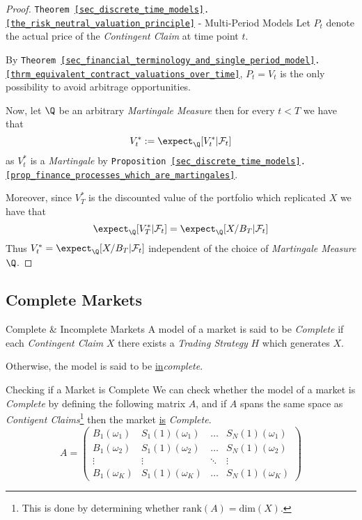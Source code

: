 \documentclass[11pt,a4paper]{article}
\begin{document}
  \begin{proof}{\texttt{Theorem \ref{sec_discrete_time_models}.\ref{the_risk_neutral_valuation_principle}} - Multi-Period Models}\label{prf_risk_neutral_valuation_principle}
    Let $P_t$ denote the actual price of the \textit{Contingent Claim} at time point $t$.
    \par By \texttt{Theorem \ref{sec_financial_terminology_and_single_period_model}.\ref{thrm_equivalent_contract_valuations_over_time}}, $P_t=V_t$ is the only possibility to avoid arbitrage opportunities.
    \par Now, let $\Q$ be an arbitrary \textit{Martingale Measure} then for every $t<T$ we have that
    \[ V_t^*:=\expect_\Q[V_t^*|\mathcal{F}_t] \]
    as $V_t^*$ is a \textit{Martingale} by \texttt{Proposition \ref{sec_discrete_time_models}.\ref{prop_finance_processes_which_are_martingales}}.
    \par Moreover, since $V_T^*$ is the discounted value of the portfolio which replicated $X$ we have that
    \[ \expect_\Q[V_T^*|\mathcal{F}_t]=\expect_\Q[X/B_T|\mathcal{F}_t] \]
    Thus $V_t^*=\expect_\Q[X/B_T|\mathcal{F}_t]$ independent of the choice of \textit{Martingale Measure} $\Q$.\proved
  \end{proof}

\subsection{Complete Markets}

  \begin{definition}{Complete \& Incomplete Markets}
    A model of a market is said to be \textit{Complete} if each \textit{Contingent Claim} $X$ there exists a \textit{Trading Strategy} $H$ which generates $X$.
    \par Otherwise, the model is said to be \underline{in}\textit{complete}.
  \end{definition}

  \begin{remark}{Checking if a Market is Complete}
    We can check whether the model of a market is \textit{Complete} by defining the following matrix $A$, and if $A$ spans the same space as \textit{Contigent Claims}\footnote{This is done by determining whether $\text{rank}(A)=\text{dim}(X)$.} then the market \underline{is} \textit{Complete}.
    \[ A=\begin{pmatrix}
        B_1(\omega_1)&S_1(1)(\omega_1)&\dots&S_N(1)(\omega_1)\\
        B_1(\omega_2)&S_1(1)(\omega_2)&\dots&S_N(1)(\omega_2)\\
        \vdots&\vdots&\ddots&\vdots\\
        B_1(\omega_K)&S_1(1)(\omega_K)&\dots&S_N(1)(\omega_K)
    \end{pmatrix} \]
  \end{remark}
\end{document}
